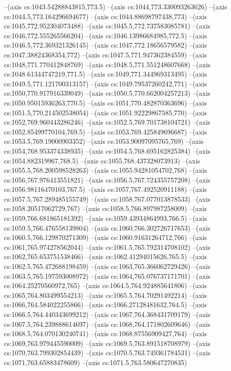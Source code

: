 --(axis cs:1043.54288843815,773.5)
--(axis cs:1044,773.330093263626)
--(axis cs:1044.5,773.164296694677)
--(axis cs:1044.88698797438,773)
--(axis cs:1045,772.952304073488)
--(axis cs:1045.5,772.737583085781)
--(axis cs:1046,772.555265566204)
--(axis cs:1046.13986684985,772.5)
--(axis cs:1046.5,772.369321326145)
--(axis cs:1047,772.18656579582)
--(axis cs:1047.38824368354,772)
--(axis cs:1047.5,771.947362384559)
--(axis cs:1048,771.770412848769)
--(axis cs:1048.5,771.551248607668)
--(axis cs:1048.61344747219,771.5)
--(axis cs:1049,771.344969313495)
--(axis cs:1049.5,771.121700313157)
--(axis cs:1049.79537260242,771)
--(axis cs:1050,770.917916339049)
--(axis cs:1050.5,770.662004257213)
--(axis cs:1050.95015936263,770.5)
--(axis cs:1051,770.482870363696)
--(axis cs:1051.5,770.214502538054)
--(axis cs:1051.92229867585,770)
--(axis cs:1052,769.960443286246)
--(axis cs:1052.5,769.701738104721)
--(axis cs:1052.85499770104,769.5)
--(axis cs:1053,769.425849696687)
--(axis cs:1053.5,769.19000903352)
--(axis cs:1053.90097095765,769)
--(axis cs:1054,768.953374338935)
--(axis cs:1054.5,768.695162825384)
--(axis cs:1054.882319967,768.5)
--(axis cs:1055,768.437328073913)
--(axis cs:1055.5,768.200598528263)
--(axis cs:1055.94281054702,768)
--(axis cs:1056,767.976413551821)
--(axis cs:1056.5,767.724355757208)
--(axis cs:1056.98116470103,767.5)
--(axis cs:1057,767.492520911188)
--(axis cs:1057.5,767.289485155749)
--(axis cs:1058,767.077013878533)
--(axis cs:1058.20517062729,767)
--(axis cs:1058.5,766.897987258009)
--(axis cs:1059,766.681865181392)
--(axis cs:1059.43934864993,766.5)
--(axis cs:1059.5,766.476558139804)
--(axis cs:1060,766.302726717653)
--(axis cs:1060.5,766.129870271309)
--(axis cs:1060.91631264712,766)
--(axis cs:1061,765.974278562044)
--(axis cs:1061.5,765.792314708102)
--(axis cs:1062,765.653751538466)
--(axis cs:1062.41294015626,765.5)
--(axis cs:1062.5,765.472688198459)
--(axis cs:1063,765.366062729426)
--(axis cs:1063.5,765.197593008972)
--(axis cs:1064,765.076737171701)
--(axis cs:1064.25270560972,765)
--(axis cs:1064.5,764.924885641806)
--(axis cs:1065,764.803499554213)
--(axis cs:1065.5,764.70291492214)
--(axis cs:1066,764.584022255866)
--(axis cs:1066.27128481632,764.5)
--(axis cs:1066.5,764.440343699212)
--(axis cs:1067,764.368431709179)
--(axis cs:1067.5,764.239888614697)
--(axis cs:1068,764.171802609646)
--(axis cs:1068.5,764.070130240741)
--(axis cs:1068.87556909427,764)
--(axis cs:1069,763.979445590009)
--(axis cs:1069.5,763.891518708979)
--(axis cs:1070,763.799302854439)
--(axis cs:1070.5,763.749361784531)
--(axis cs:1071,763.65883478609)
--(axis cs:1071.5,763.580647270835)
